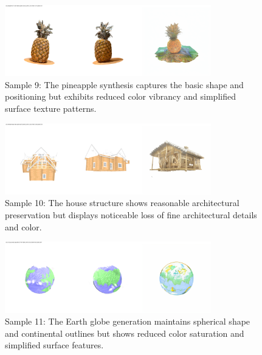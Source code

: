 \begin{figure}[htbp]
  \centering
  \includegraphics[width=0.8\textwidth, trim=0 0 0 20pt, clip]{images/experiments/samples/comparison_batch0118_uid_a60ba306-6517-5367-8858-ca3d9d113b1e.png}
  \caption{Sample 9: The pineapple synthesis captures the basic shape and positioning but exhibits reduced color vibrancy and simplified surface texture patterns.}
  \label{fig:sample_9}
\end{figure}

\begin{figure}[htbp]
  \centering
  \includegraphics[width=0.8\textwidth, trim=0 0 0 20pt, clip]{images/experiments/samples/comparison_batch0153_uid_b8198c64-8ed6-54cb-bd39-63a5720b9453.png}
  \caption{Sample 10: The house structure shows reasonable architectural preservation but displays noticeable loss of fine architectural details and color.}
  \label{fig:sample_10}
\end{figure}

\begin{figure}[htbp]
  \centering
  \includegraphics[width=0.8\textwidth, trim=0 0 0 20pt, clip]{images/experiments/samples/comparison_batch0156_uid_5312cb2b-e4b2-5dca-8f60-31744714fb94.png}
  \caption{Sample 11: The Earth globe generation maintains spherical shape and continental outlines but shows reduced color saturation and simplified surface features.}
  \label{fig:sample_11}
\end{figure}

